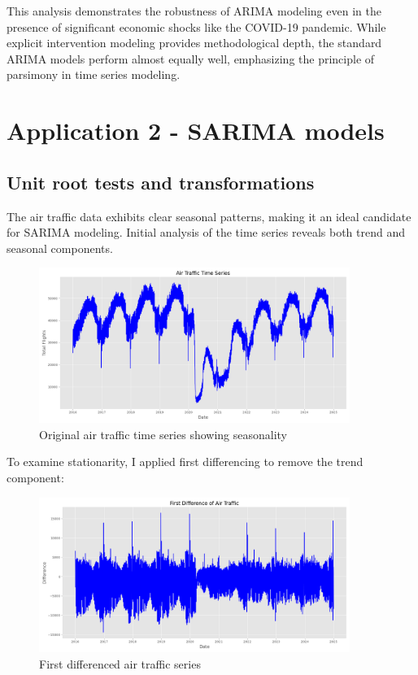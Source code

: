 \documentclass[11pt,a4paper]{article}
\begin{document}
This analysis demonstrates the robustness of ARIMA modeling even in the presence of significant economic shocks like the COVID-19 pandemic. While explicit intervention modeling provides methodological depth, the standard ARIMA models perform almost equally well, emphasizing the principle of parsimony in time series modeling.

\section{Application 2 - SARIMA models}

\subsection{Unit root tests and transformations}

The air traffic data exhibits clear seasonal patterns, making it an ideal candidate for SARIMA modeling. Initial analysis of the time series reveals both trend and seasonal components.

\begin{figure}[H]
    \centering
    \includegraphics[width=0.9\textwidth]{plots/sarima/airtraffic_time_series.png}
    \caption{Original air traffic time series showing seasonality}
    \label{fig:airtraffic_series}
\end{figure}

To examine stationarity, I applied first differencing to remove the trend component:

\begin{figure}[H]
    \centering
    \includegraphics[width=0.9\textwidth]{plots/sarima/airtraffic_first_diff.png}
    \caption{First differenced air traffic series}
    \label{fig:airtraffic_diff}
\end{figure}
\end{document}
